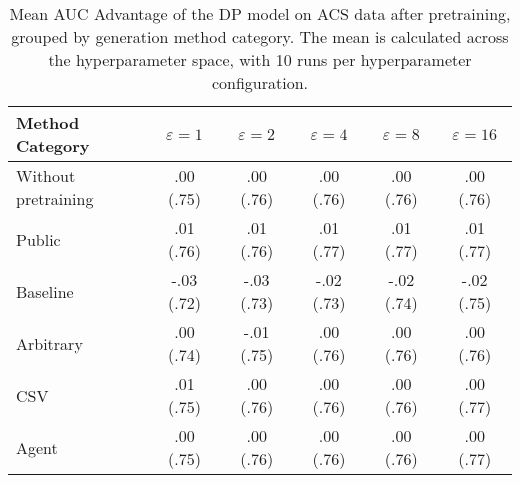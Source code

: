 \begin{table}[h!]
    \centering
    \caption{Mean AUC Advantage of the DP model on ACS data after pretraining, grouped by generation method category. The mean is calculated across the hyperparameter space, with 10 runs per hyperparameter configuration.}
    \label{tab:epsilon_comparison}
    \begin{tabular}{lccccc}
    \toprule
    Method Category & $\varepsilon=1$ & $\varepsilon=2$ & $\varepsilon=4$ & $\varepsilon=8$ & $\varepsilon=16$ \\
    \midrule
    Without pretraining & .00 {\small (.75)} & .00 {\small (.76)} & .00 {\small (.76)} & .00 {\small (.76)} & .00 {\small (.76)} \\
    \arrayrulecolor{black!50!}\midrule
    Public & \cellcolor{gold!30}.01 {\small (.76)} & \cellcolor{gold!30}.01 {\small (.76)} & \cellcolor{gold!30}.01 {\small (.77)} & \cellcolor{gold!30}.01 {\small (.77)} & \cellcolor{gold!30}.01 {\small (.77)} \\
    \arrayrulecolor{black!50!}\midrule
    Baseline & -.03 {\small (.72)} & -.03 {\small (.73)} & -.02 {\small (.73)} & -.02 {\small (.74)} & -.02 {\small (.75)} \\
    \arrayrulecolor{black!50!}\midrule
    Arbitrary & .00 {\small (.74)} & -.01 {\small (.75)} & \cellcolor{bronze!30}.00 {\small (.76)} & .00 {\small (.76)} & .00 {\small (.76)} \\
    \arrayrulecolor{black!50!}\midrule
    CSV & \cellcolor{silver!30}.01 {\small (.75)} & \cellcolor{silver!30}.00 {\small (.76)} & \cellcolor{silver!30}.00 {\small (.76)} & \cellcolor{silver!30}.00 {\small (.76)} & \cellcolor{bronze!30}.00 {\small (.77)} \\
    Agent & \cellcolor{bronze!30}.00 {\small (.75)} & \cellcolor{bronze!30}.00 {\small (.76)} & \cellcolor{silver!30}.00 {\small (.76)} & \cellcolor{bronze!30}.00 {\small (.76)} & \cellcolor{silver!30}.00 {\small (.77)} \\
    \bottomrule
    \end{tabular}
\end{table}